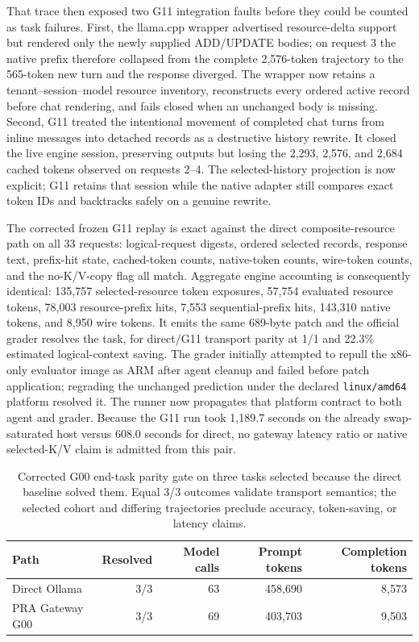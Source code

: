 \documentclass[11pt]{article}
\begin{document}
That trace then exposed two G11 integration faults before they could be counted
as task failures.  First, the llama.cpp wrapper advertised resource-delta
support but rendered only the newly supplied ADD/UPDATE bodies; on request 3
the native prefix therefore collapsed from the complete 2,576-token trajectory
to the 565-token new turn and the response diverged.  The wrapper now retains a
tenant--session--model resource inventory, reconstructs every ordered active
record before chat rendering, and fails closed when an unchanged body is
missing.  Second, G11 treated the intentional movement of completed chat turns
from inline messages into detached records as a destructive history rewrite.
It closed the live engine session, preserving outputs but losing the 2,293,
2,576, and 2,684 cached tokens observed on requests 2--4.  The selected-history
projection is now explicit; G11 retains that session while the native adapter
still compares exact token IDs and backtracks safely on a genuine rewrite.

The corrected frozen G11 replay is exact against the direct composite-resource path on all 33
requests: logical-request digests, ordered selected records, response text,
prefix-hit state, cached-token counts, native-token counts, wire-token counts,
and the no-K/V-copy flag all match.  Aggregate engine accounting is consequently
identical: 135,757 selected-resource token exposures, 57,754 evaluated resource
tokens, 78,003 resource-prefix hits, 7,553 sequential-prefix hits, 143,310
native tokens, and 8,950 wire tokens.  It emits the same 689-byte patch and the
official grader resolves the task, for direct/G11 transport parity at 1/1 and
22.3\% estimated logical-context saving.  The grader initially attempted to
repull the x86-only evaluator image as ARM after agent cleanup and failed before
patch application; regrading the unchanged prediction under the declared
\texttt{linux/amd64} platform resolved it.  The runner now propagates that
platform contract to both agent and grader.  Because the G11 run took 1,189.7
seconds on the already swap-saturated host versus 608.0 seconds for direct, no
gateway latency ratio or native selected-K/V claim is admitted from this pair.

\begin{table}[H]
\centering
\small
\caption{Corrected G00 end-task parity gate on three tasks selected because the
direct baseline solved them. Equal 3/3 outcomes validate transport semantics;
the selected cohort and differing trajectories preclude accuracy, token-saving,
or latency claims.}
\begin{tabular}{lrrrr}
\toprule
Path & Resolved & Model calls & Prompt tokens & Completion tokens \\
\midrule
Direct Ollama & 3/3 & 63 & 458,690 & 8,573 \\
PRA Gateway G00 & 3/3 & 69 & 403,703 & 9,503 \\
\bottomrule
\end{tabular}
\label{tab:gateway-g00-parity}
\end{table}
\end{document}
